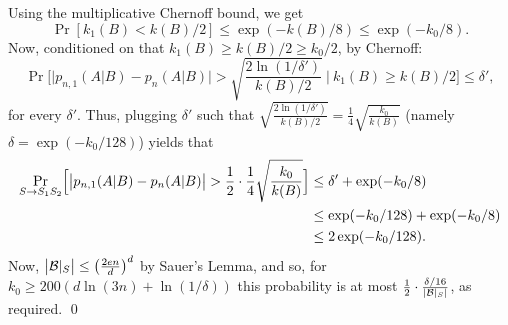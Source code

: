 \documentclass{article}
\newtheorem{lemma}[theorem]{Lemma}
\newcommand{\B}{{\cal B}}
\newcommand{\samp}{S}
\newcommand{\comment}[3]{\marginpar{\textcolor{#2}{#1: #3}}}
\newcommand{\shay}[1]{\comment{Shay}{red}{#1}}
\begin{document}
Using the multiplicative Chernoff bound, we get 
\shay{Here we should refer to the statement that sampling without repetitions is more concentrated.}
\[ \Pr[k_1(B) < k(B)/2] \leq \exp(-k(B)/8) \leq \exp(-k_0/8).\]
Now, conditioned on that $k_1(B) \geq k(B)/2\geq k_0/2$, by Chernoff:
\[\Pr\Biggl[ \bigl\lvert p_{n,1}(A \vert B) - p_n(A \vert B) \bigr\rvert >\sqrt{\frac{2\ln(1/\delta')}{k(B)/2}}~ \Biggr\vert~ k_1(B) \geq k(B)/2\Biggr] \leq \delta',
\]
for every $\delta'$. 
Thus, plugging $\delta'$ such that $\sqrt{\frac{2\ln(1/\delta')}{k(B)/2}} = \frac{1}{4}\sqrt{\frac{k_0}{k(B)}}$
(namely $\delta = \exp(-k_0/128)$) yields that
\begin{align*}
\Pr_{S\to S_1S_2}\Bigl[\bigl\lvert p_{n,1}(A \vert B) - p_{n}(A \vert B)  \bigr\rvert > \frac{1}{2}\cdot\frac{1}{4}\sqrt{\frac{k_0}{k(B)}} \Bigr] 
&\leq  \delta' + \exp(-k_0/8)\\
&\leq  \exp(-k_0/128) + \exp(-k_0/8)\\
&\leq 2\exp(-k_0/128).
\end{align*}
Now, $\bigl\lvert \B|_S\bigr\rvert \leq \bigl(\frac{2en}{d}\bigr)^d$ by Sauer's Lemma,  and so, for $k_0\geq 200(d\ln(3n) + \ln(1/\delta))$ this probability is at most $\frac{1}{2}\cdot\frac{\delta/16}{\lvert \B|_S\rvert}$, as required.
\qed


%
%
%
%
\end{document}
